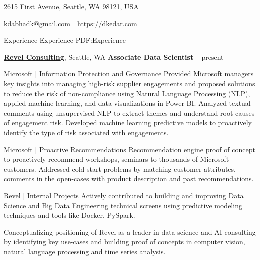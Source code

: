 \documentclass[letterpaper,MMMyyyy,nonstopmode]{simpleresumecv}
\newcommand{\CVAuthor}{Kedar Dabhadkar}
\newcommand{\CVWebpage}{https://dkedar.com}
\begin{document}

\Title{\CVAuthor}

\begin{SubTitle}
\href{https://www.google.com/maps/place/2619+First+Avenue,+Seattle,+WA+98121,+USA}
{2615 First Avenue, Seattle, WA 98121, USA}
\par
\href{mailto:kdabhadk@gmail.com}
{kdabhadk@gmail.com}
\,\SubBulletSymbol\,
\href{\CVWebpage}
{\url{\CVWebpage}}
\end{SubTitle}

\begin{Body}

\Section
{Experience}
{Experience}
{PDF:Experience}

\Entry
\href{http://www.revelconsulting.com/}
{\textbf{Revel Consulting}},
Seattle, WA
\Entry
\textbf{Associate Data Scientist}
\hfill
{} --
present

\Gap
\BulletItem
Microsoft | Information Protection and Governance
\SubBulletItem
Provided Microsoft managers key insights into managing high-risk supplier engagements and proposed solutions to reduce the risk of non-compliance using Natural Language Processing (NLP), applied machine learning, and data visualizations in Power BI.
\SubBulletItem
Analyzed textual comments using unsupervised NLP to extract themes and understand root causes of engagement risk.
\SubBulletItem
Developed machine learning predictive models to proactively identify the type of risk associated with engagements.

\BulletItem
Microsoft | Proactive Recommendations
\SubBulletItem
Recommendation engine proof of concept to proactively recommend workshops, seminars to thousands of Microsoft customers.
\SubBulletItem
Addressed cold-start problems by matching customer attributes, comments in the open-cases with product description and past recommendations.

\BulletItem
Revel | Internal Projects
\SubBulletItem
Actively contributed to building and improving Data Science and Big Data Engineering technical screens using predictive modeling techniques and tools like Docker, PySpark.

\SubBulletItem
Conceptualizing positioning of Revel as a leader in data science and AI consulting by identifying key use-cases and building proof of concepts in computer vision, natural language processing and time series analysis.

\BigGap


\end{Body}
\end{document}
